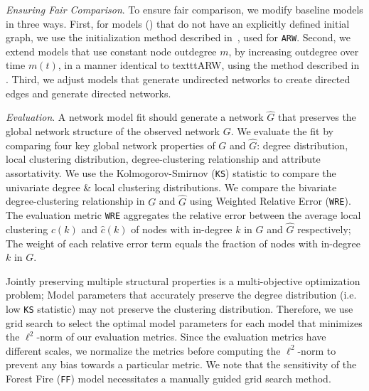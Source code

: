 \textit{Ensuring Fair Comparison}. To ensure fair comparison, we modify baseline models in three ways. First, for models () that do not have an explicitly defined initial graph, we use the
initialization method described in~, used for \texttt{ARW}. Second, we extend
models that use constant node outdegree $m$, by increasing outdegree over time $m(t)$, in a manner identical to texttt{ARW}, using the method described in . Third, we adjust models
that generate undirected networks to create directed edges and generate directed networks.

\textit{Evaluation}. A network model fit should generate a network $\hat{G}$ that
preserves the global network structure of the observed network $G$. We evaluate
the fit by comparing four key global network properties of ${G}$ and $\hat{G}$:
degree distribution, local clustering distribution, degree-clustering relationship
and attribute assortativity.
We use the Kolmogorov-Smirnov (\texttt{KS}) statistic to compare the univariate degree
\& local clustering distributions.
We compare the bivariate degree-clustering relationship in $G$ and $\hat{G}$ using
Weighted Relative Error (\texttt{WRE}). The evaluation metric \texttt{WRE} aggregates the relative error
between the average local clustering $c(k)$ and $\hat{c}(k)$ of nodes  with in-degree $k$
in $G$ and $\hat{G}$ respectively; The weight of each relative error term equals the fraction
of nodes with in-degree $k$ in $G$.

Jointly preserving multiple structural properties is a multi-objective optimization
problem; Model parameters that accurately preserve the degree distribution
(i.e. low \texttt{KS} statistic) may not preserve the clustering distribution.
Therefore, we use grid search to select the optimal model parameters for each model that minimizes the
$\ell^2$-norm of our evaluation metrics. Since the evaluation metrics have
different scales, we normalize the metrics before computing the $\ell^2$-norm
to prevent any bias towards a particular metric. We note that the sensitivity of the Forest Fire (\texttt{FF}) model necessitates a manually guided grid search method.


